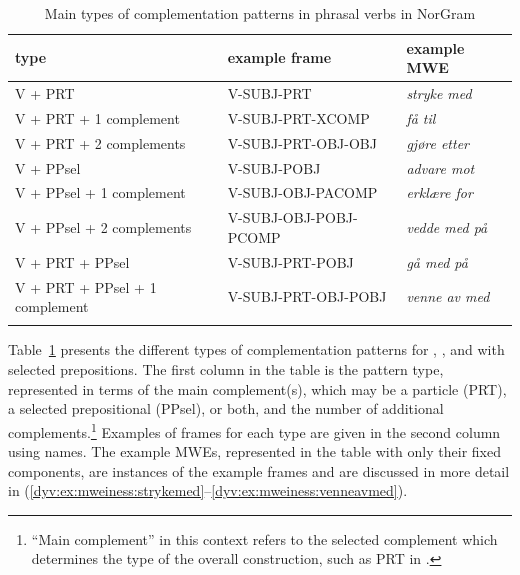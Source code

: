 \documentclass[output=paper]{langsci/langscibook}
\begin{document}
\begin{table}
  \begin{tabular}{l@{~}l@{~}l}
    \lsptoprule
    type & example frame & example MWE \\
    \midrule
    \textsf{V + PRT} & \textsf{V-SUBJ-PRT} & \emph{stryke med} \\
    \textsf{V + PRT} + 1 complement & \textsf{V-SUBJ-PRT-XCOMP} & \emph{få til} \\
    \textsf{V + PRT} + 2 complements & \textsf{V-SUBJ-PRT-OBJ-OBJ} & \emph{gjøre etter}\\     \tablevspace
    \textsf{V + PPsel} & \textsf{V-SUBJ-POBJ} & \emph{advare mot} \\
    \textsf{V + PPsel} + 1 complement  & \textsf{V-SUBJ-OBJ-PACOMP} & \emph{erklære for} \\
    \textsf{V + PPsel} + 2 complements & \textsf{V-SUBJ-OBJ-POBJ-PCOMP} & \emph{vedde med på} \\ \tablevspace
    \textsf{V + PRT + PPsel} & \textsf{V-SUBJ-PRT-POBJ} & \emph{gå med på} \\
    \textsf{V + PRT + PPsel} + 1 complement & \textsf{V-SUBJ-PRT-OBJ-POBJ} & \emph{venne av med} \\ %
    \lspbottomrule
  \end{tabular}
  \caption{Main types of complementation patterns in phrasal verbs in NorGram}
  \label{dyv:tab:mweiness:phrasaltypes}
\end{table}

Table~\ref{dyv:tab:mweiness:phrasaltypes} presents the different types of complementation patterns for , , and  with selected prepositions.
The first column in the table is the pattern type, represented in terms of the main complement(s), which may be a particle (\textsf{PRT}), a selected prepositional  (\textsf{PPsel)}, or both, and the number of additional complements.\footnote{``Main complement'' in this context refers to the selected complement which determines the type of the overall construction, such as \textsf{PRT} in .} 
Examples of  frames for each type are given in the second column using  names.
The example MWEs, represented in the table with only their fixed components, are instances of the example frames and are discussed in more detail in (\ref{dyv:ex:mweiness:strykemed}--\ref{dyv:ex:mweiness:venneavmed}).
\end{document}
